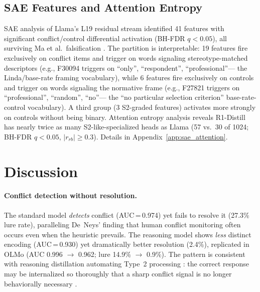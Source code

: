 \documentclass{article}
\newcommand{\stwo}{S2-like}
\begin{document}
\subsection{SAE Features and Attention Entropy}
\label{sec:results_sae_attention}

SAE analysis of Llama's L19 residual stream identified 41 features with
significant conflict/control differential activation (BH-FDR $q < 0.05$),
all surviving Ma et al.\ falsification \citep{ma2026falsification}.  The
partition is interpretable: 19 features fire exclusively on conflict
items and trigger on words signaling stereotype-matched descriptors
(e.g., F30094 triggers on ``only'', ``respondent'', ``professional''---
the Linda/base-rate framing vocabulary), while 6 features fire
exclusively on controls and trigger on words signaling the normative
frame (e.g., F27821 triggers on ``professional'', ``random'', ``no''---
the ``no particular selection criterion'' base-rate-control vocabulary).
A third group (3 S2-graded features) activates more strongly on controls
without being binary.  Attention entropy analysis reveals R1-Distill has
nearly twice as many \stwo{}-specialized heads as Llama (57 vs.\ 30 of
1024; BH-FDR $q < 0.05$, $|r_{rb}| \geq 0.3$).  Details in
Appendix~\ref{app:sae_attention}.


\section{Discussion}
\label{sec:discussion}

\paragraph{Conflict detection without resolution.}
The standard model \emph{detects} conflict (AUC\,=\,0.974) yet fails
to resolve it (27.3\% lure rate), paralleling De~Neys' finding
\citep{deneys2012bias} that human conflict monitoring often occurs even
when the heuristic prevails.
The reasoning model shows \emph{less} distinct encoding (AUC\,=\,0.930)
yet dramatically better resolution (2.4\%), replicated in OLMo
(AUC 0.996 $\to$ 0.962; lure 14.9\% $\to$ 0.9\%).
The pattern is consistent with reasoning distillation automating
Type~2 processing \citep{evans2019reflections}: the correct response
may be internalized so thoroughly that a sharp conflict signal is no
longer behaviorally necessary \citep{venhoff2025base}.
\end{document}
